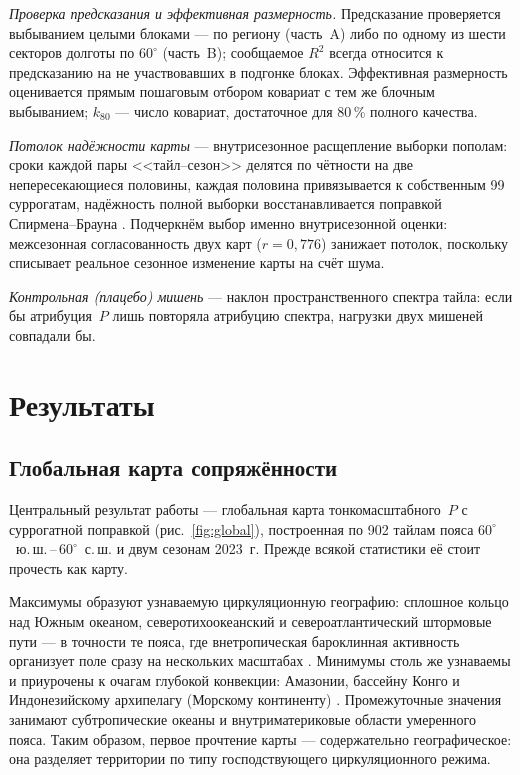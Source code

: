 \documentclass[11pt,a4paper]{article}
\begin{document}
\emph{Проверка предсказания и эффективная размерность.} Предсказание проверяется выбыванием целыми блоками --- по региону (часть~A) либо по одному из шести секторов долготы по $60^\circ$ (часть~B); сообщаемое $R^2$ всегда относится к предсказанию на не участвовавших в подгонке блоках. Эффективная размерность оценивается прямым пошаговым отбором ковариат с тем же блочным выбыванием; $k_{80}$ --- число ковариат, достаточное для 80\,\% полного качества.

\emph{Потолок надёжности карты} --- внутрисезонное расщепление выборки пополам: сроки каждой пары <<тайл--сезон>> делятся по чётности на две непересекающиеся половины, каждая половина привязывается к собственным 99 суррогатам, надёжность полной выборки восстанавливается поправкой Спирмена--Брауна \cite{Spearman1910,Brown1910}. Подчеркнём выбор именно внутрисезонной оценки: межсезонная согласованность двух карт ($r=0{,}776$) занижает потолок, поскольку списывает реальное сезонное изменение карты на счёт шума.

\emph{Контрольная (плацебо) мишень} --- наклон пространственного спектра тайла: если бы атрибуция~$P$ лишь повторяла атрибуцию спектра, нагрузки двух мишеней совпадали бы.

\section{Результаты}
\label{sec:results}

\subsection{Глобальная карта сопряжённости}
\label{sec:map}

Центральный результат работы --- глобальная карта тонкомасштабного~$P$ с суррогатной поправкой (рис.~\ref{fig:global}), построенная по 902 тайлам пояса $60^\circ$~ю.\,ш.\,--\,$60^\circ$~с.\,ш. и двум сезонам 2023~г. Прежде всякой статистики её стоит прочесть как карту.

Максимумы образуют узнаваемую циркуляционную географию: сплошное кольцо над Южным океаном, северотихоокеанский и североатлантический штормовые пути --- в точности те пояса, где внетропическая бароклинная активность организует поле сразу на нескольких масштабах \cite{HoskinsValdes1990,Chang2002,HoskinsHodges2005,Shaw2016}. Минимумы столь же узнаваемы и приурочены к очагам глубокой конвекции: Амазонии, бассейну Конго и Индонезийскому архипелагу (Морскому континенту) \cite{NealeSlingo2003,Feng2021}. Промежуточные значения занимают субтропические океаны и внутриматериковые области умеренного пояса. Таким образом, первое прочтение карты --- содержательно географическое: она разделяет территории по типу господствующего циркуляционного режима.
\end{document}
